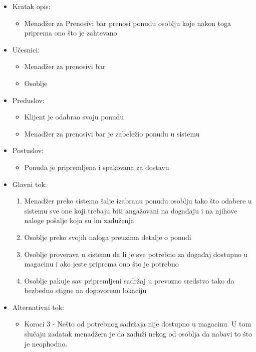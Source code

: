 \documentclass[a4paper]{article}
\begin{document}
\begin{itemize}
    \item Kratak opis:
        \begin{itemize}
            \item Menadžer za Prenosivi bar prenosi ponudu osoblju koje nakon toga priprema ono što je zahtevano
        \end{itemize}
    \item Učesnici:
        \begin{itemize}
            \item Menadžer za prenosivi bar
            \item Osoblje
        \end{itemize}
    \item Preduslov:
        \begin{itemize}
            \item Klijent je odabrao svoju ponudu
		    \item Menadžer za prenosivi bar je zabeležio ponudu u sistemu
        \end{itemize}
    \item Postuslov:
        \begin{itemize}
            \item Ponuda je pripremljena i spakovana za dostavu
        \end{itemize}
    \item Glavni tok:
        \begin{enumerate}
           \item Menadžer preko sistema šalje izabranu ponudu osoblju tako što odabere u sistemu sve one koji trebaju biti angažovani na događaju i na njihove naloge pošalje koja su im zaduženja
		   \item Osoblje preko svojih naloga preuzima detalje o ponudi
	       \item Osoblje proverava u sistemu da li je sve potrebno za događaj dostupno u magacinu i ako jeste priprema ono što je potrebno
	        \item Osoblje pakuje sav pripremljeni sadržaj u prevozno sredstvo tako da bezbedno stigne na dogovorenu lokaciju 
        \end{enumerate}
    \item Alternativni tok:
        \begin{itemize}
            \item Koraci 3 - Nešto od potrebnog sadržaja nije dostupno u magacinu. U tom slučaju zadatak menadžera je da zaduži nekog od osoblja da nabavi to što je neophodno.
        \end{itemize}
\end{itemize}
\end{document}
